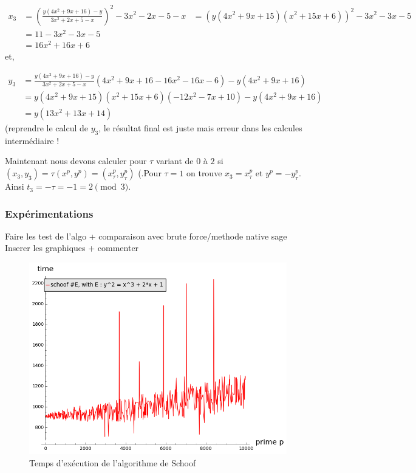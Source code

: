 \documentclass{article}
\begin{document}
\begin{align*}
x_3 &= (\frac{y(4x^2+9x+16) - y}{3x^2 +2x +5 - x})^2 -3x^2 -2x - 5 - x 
 	&= (y(4x^2+9x+15)(x^2+15x+6))^2 -3x^2 -3x - 5 \\
 	&= 11 - 3x^2 -3x - 5  \\
 	&= 16x^2 + 16x + 6 
\end{align*}
et, 

\begin{align*}
y_3 &= \frac{y(4x^2+9x+16) - y}{3x^2 +2x +5 - x} (4x^2+9x+16 -  16x^2 - 16x - 6) - y(4x^2+9x+16) \\
	&= y(4x^2+9x+15)(x^2+15x+6)( -12x^2 - 7x +10 ) - y(4x^2+9x+16)\\
	&= y(13x^2 + 13x + 14)
\end{align*}
(reprendre le calcul de $y_3$, le résultat final est juste mais erreur dans les calcules intermédiaire !

Maintenant nous devons calculer pour $\tau$ variant de $0$ à $2$ si $(x_3, y_3) = \tau (x^p, y^p)=(x_{\tau}^p, y_{\tau}^p)$  (.Pour $\tau = 1$ on trouve $x_3 = x_{\tau}^p$ et $y^p= - y_{\tau}^p$. Ainsi $t_3 = -\tau = -1 = 2 \pmod 3$. 

\newpage
\subsubsection{Expérimentations}

Faire les test de l'algo + comparaison avec brute force/methode native sage
Inserer les graphiques + commenter 

\begin{figure}[h!]
\includegraphics[scale=0.6]{pictures/schoof_cputime.png} 
\caption{Temps d'exécution de l'algorithme de Schoof}
\end{figure}
\end{document}

